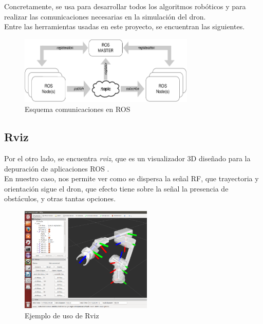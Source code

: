 Concretamente, se usa para desarrollar todos los algoritmos robóticos y para realizar las comunicaciones necesarias en la simulación del dron.\\

Entre las herramientas usadas en este proyecto, se encuentran las siguientes.

\begin{figure} [H]
	\begin{center}
	\includegraphics[height=3.25cm]{imagenes/cap3/1_ros_esquema.png}
	\end{center}
	\caption[Esquema de comunicaciones en ROS]{Esquema comunicaciones en ROS}
	\label{fig:ros}
\end{figure}

\subsection{Rviz}
\label{subsec:rviz}

Por el otro lado, se encuentra \emph{rviz}, que es un visualizador 3D diseñado para la depuración de aplicaciones \ac{ROS} \cite{rviz-def}.\\

En nuestro caso, nos permite ver como se dispersa la señal \ac{RF}, que trayectoria y orientación sigue el dron, que efecto tiene sobre la señal la presencia de obstáculos, y otras tantas opciones.\\

\begin{figure} [H]
	\begin{center}
	\includegraphics[height=5cm]{imagenes/cap3/3_rviz_example.png}
	\end{center}
	\caption[Ejemplo de uso de Rviz]{Ejemplo de uso de Rviz}
	\label{fig:rviz}
\end{figure}


